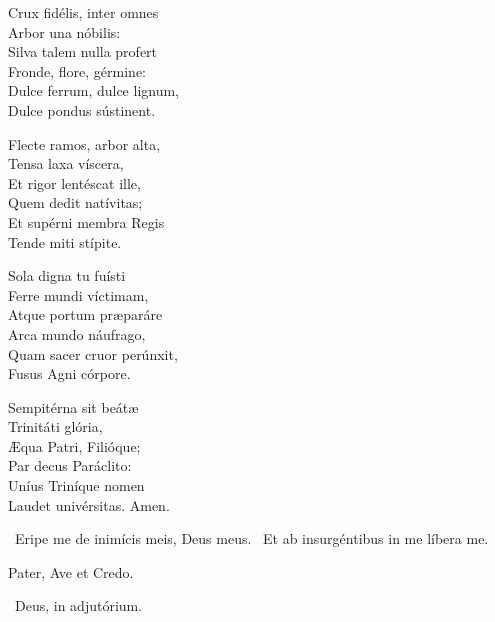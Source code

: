 Crux fidélis, inter omnes\\
Arbor una nóbilis:\\
Silva talem nulla profert\\
Fronde, flore, gérmine:\\
Dulce ferrum, dulce lignum,\\
Dulce pondus sústinent.

Flecte ramos, arbor alta,\\
Tensa laxa víscera,\\
Et rigor lentéscat ille,\\
Quem dedit natívitas;\\
Et supérni membra Regis\\
Tende miti stípite.

Sola digna tu fuísti\\
Ferre mundi víctimam,\\
Atque portum præparáre\\
Arca mundo náufrago,\\
Quam sacer cruor perúnxit,\\
Fusus Agni córpore.

Sempitérna sit beátæ\\
Trinitáti glória,\\
Æqua Patri, Filióque;\\
Par decus Paráclito:\\
Uníus Triníque nomen\\
Laudet univérsitas. Amen.

\V\ Eripe me de inimícis meis, Deus meus. \R\ Et ab insurgéntibus in me líbera me.




\sectionornament




Pater, Ave et Credo.

\V\ Deus, in adjutórium.

